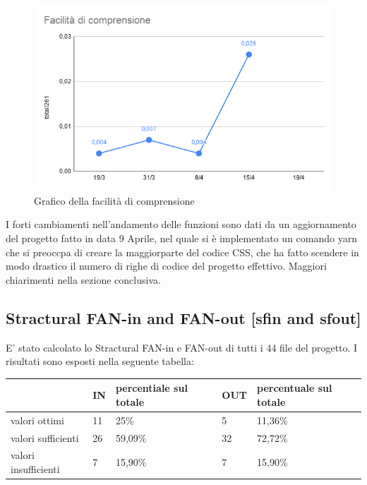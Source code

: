 \begin{figure}[H]
    \centering
    \includegraphics[width=10 cm]{source/sections/images/facilita_comprensione.png}
    \caption{Grafico della facilità di comprensione}
\end{figure}

I forti cambiamenti nell'andamento delle funzioni sono dati da un aggiornamento del progetto fatto in data
9 Aprile, nel quale si è implementato un comando yarn che si preoccpa di creare la maggiorparte del
codice CSS, che ha fatto scendere in modo drastico il numero di righe di codice del progetto effettivo. Maggiori chiarimenti nella sezione conclusiva.

\newpage
\subsection{Stractural FAN-in and FAN-out  [sfin and sfout]}
E' stato calcolato lo Stractural FAN-in e FAN-out di tutti i 44 file del progetto. I risultati sono esposti nella seguente tabella:

\begin{longtabu} to \textwidth {| X[0.1,c m] | X[0.1,c m] | X[0.1,c m] | X[0.1,c m] | X[0.1,c m] |}
    \hline
    \textbf{} &
    \textbf{IN} &
    \textbf{percentiale sul totale} &
    \textbf{OUT} &
    \textbf{percentuale sul totale} \\
    \hline
    valori ottimi & 11 & 25\% & 5 & 11,36\% \\ 
    \hline
    valori sufficienti & 26 & 59,09\% & 32 & 72,72\% \\ 
    \hline
    valori insufficienti & 7 & 15,90\% & 7 & 15,90\% \\ 
    \hline

    \end{longtabu}

